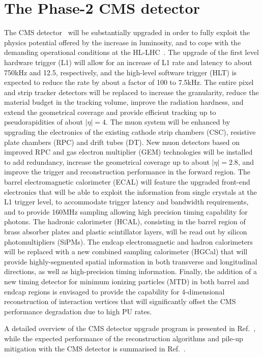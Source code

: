 \section{The Phase-2 CMS detector}
\label{section:Phase_II_CMS}

The CMS detector~\cite{Chatrchyan:2008aa} will be substantially upgraded in order to fully exploit the physics potential offered by the increase in luminosity, and to cope with the demanding operational conditions at the HL-LHC~\cite{CMSCollaboration:2015zni, Klein:2017nke, Collaboration:2283187, Collaboration:2293646, Collaboration:2283189}. The upgrade of the first level hardware trigger (L1) will allow for an increase of L1 rate and latency to about 750\unit{kHz} and 12.5\mus, respectively, and the high-level software trigger (HLT) is expected to reduce the rate by about a factor of 100 to 7.5\unit{kHz}. The entire pixel and strip tracker detectors will be replaced to increase the granularity, reduce the material budget in the tracking volume, improve the radiation hardness, and extend the geometrical coverage and provide efficient tracking up to pseudorapidities of about $|\eta|=4$. The muon system will be enhanced by upgrading the electronics of the existing cathode strip chambers (CSC), resistive plate chambers (RPC) and drift tubes (DT). New muon detectors based on improved RPC and gas electron multiplier (GEM) technologies will be installed to add redundancy, increase the geometrical coverage up to about $|\eta|=2.8$, and improve the trigger and reconstruction performance in the forward region. The barrel electromagnetic calorimeter (ECAL) will feature the upgraded front-end electronics that will be able to exploit the information from single crystals at the L1 trigger level, to accommodate trigger latency and bandwidth requirements, and to provide 160\unit{MHz} sampling allowing high precision timing capability for photons. The hadronic calorimeter (HCAL), consisting in the barrel region of brass absorber plates and plastic scintillator layers, will be read out by silicon photomultipliers (SiPMs). The endcap electromagnetic and hadron calorimeters will be replaced with a new combined sampling calorimeter (HGCal) that will provide highly-segmented spatial information in both transverse and longitudinal directions, as well as high-precision timing information. Finally, the addition of a new timing detector for minimum ionizing particles (MTD) in both barrel and endcap regions is envisaged to provide the capability for 4-dimensional reconstruction of interaction vertices that will significantly offset the CMS performance degradation due to high PU rates.

A detailed overview of the CMS detector upgrade program is presented in Ref.~\cite{CMSCollaboration:2015zni, Klein:2017nke, Collaboration:2283187, Collaboration:2293646, Collaboration:2283189, CMS:2667167, CERN-LHCC-2020-004, Collaboration:2759072}, while the expected performance of the reconstruction algorithms and pile-up mitigation with the CMS detector is summarised in Ref.~\cite{Collaboration:2650976}.

